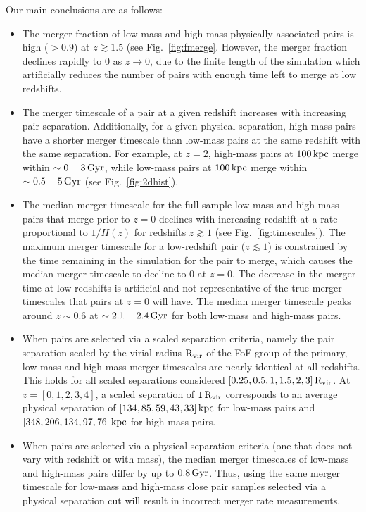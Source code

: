 \documentclass[twocolumn,linenumbers]{aastex631}
\begin{document}
    Our main conclusions are as follows: 
    \begin{itemize}
        \item The merger fraction of low-mass and high-mass physically associated pairs is high ($>0.9$) at $z\gtrsim1.5$ (see Fig.~\ref{fig:fmerge}. However, the merger fraction declines rapidly to 0 as $z\to0$, due to the finite length of the simulation which artificially reduces the number of pairs with enough time left to merge at low redshifts. %
        \item The merger timescale of a pair at a given redshift increases with increasing pair separation. Additionally, for a given physical separation, high-mass pairs have a shorter merger timescale than low-mass pairs at the same redshift with the same separation. For example, at $z=2$, high-mass pairs at $100\mathrm{\,kpc}$ merge within $\sim 0-3 \mathrm{\,Gyr}$, while low-mass pairs at $100\mathrm{\,kpc}$ merge within $\sim 0.5-5\mathrm{\,Gyr}$ (see Fig.~\ref{fig:2dhist}).
        \item The median merger timescale for the full sample low-mass and high-mass pairs that merge prior to $z=0$ declines with increasing redshift at a rate proportional to $1/H(z)$ for redshifts $z\gtrsim1$ (see Fig.~\ref{fig:timescales}). 
        The maximum merger timescale for a low-redshift pair ($z\lesssim1$) is constrained by the time remaining in the simulation for the pair to merge, which causes the median merger timescale to decline to 0 at $z=0$. 
        The decrease in the merger time at low redshifts is artificial and not representative of the true merger timescales that pairs at $z=0$ will have.
        The median merger timescale peaks around $z\sim0.6$ at $\sim2.1-2.4\mathrm{\,Gyr}$ for both low-mass and high-mass pairs.
        \item When pairs are selected via a scaled separation criteria, namely the pair separation scaled by the virial radius $\rm R_{vir}$ of the FoF group of the primary, low-mass and high-mass merger timescales are nearly identical at all redshifts. This holds for all scaled separations considered $[0.25,0.5,1,1.5,2,3]\,\rm R_{vir}$. At $z=[0, 1, 2, 3, 4]$, a scaled separation of $1\,\rm R_{vir}$ corresponds to an average physical separation of $[134, 85, 59, 43, 33]\mathrm{\,kpc}$ for low-mass pairs and $[348, 206, 134, 97, 76] \mathrm{\,kpc}$ for high-mass pairs.
        \item When pairs are selected via a physical separation criteria (one that does not vary with redshift or with mass), the median merger timescales of low-mass and high-mass pairs differ by up to $0.8\mathrm{\,Gyr}$. Thus, using the same merger timescale for low-mass and high-mass close pair samples selected via a physical separation cut will result in incorrect merger rate measurements.
    \end{itemize}
\end{document}
